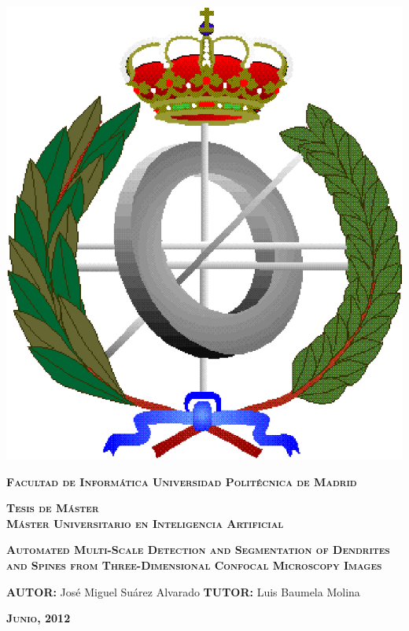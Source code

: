 \newenvironment{titlemargin}[2]{%
\enlargethispage{4cm}%
\begin{list}{}{%
\setlength{\topsep}{0pt}%
\setlength{\leftmargin}{0cm}%
\setlength{\rightmargin}{-1.5cm}%
\setlength{\listparindent}{\parindent}%
\setlength{\itemindent}{\parindent}%
\setlength{\parsep}{\parskip}%
}%
\item[]}{\end{list}}
\begin{titlepage}
\begin{titlemargin}
\noindent
\rlap{\parbox[c]{0.12\linewidth}{\includegraphics[width=\linewidth]{facultad}}}
\hfil
\parbox{0.8\textwidth}{
\centering
\bfseries
\protect \textsc{\Large Facultad de Informática}
\vspace{0.5cm}
{\textsc{\large Universidad Politécnica de Madrid}}
}\hfil
\vfil
\begin{center}
\Large \bfseries
\textsc{\LARGE Tesis de Máster} \\
\bigskip
\textsc{\LARGE Máster Universitario en Inteligencia Artificial}
\end{center}
\vfil
\begin{center}
\Huge \bfseries \textsc{Automated Multi-Scale Detection and Segmentation of Dendrites and Spines from Three-Dimensional Confocal Microscopy Images}
\end{center}
\vspace{3cm}
\vfil
\textbf{AUTOR:} José Miguel Suárez Alvarado
\textbf{TUTOR:} Luis Baumela Molina
\bigskip
\begin{center}
\textbf{\textsc{Junio, 2012}}
\end{center}
\end{titlemargin}
\end{titlepage}
